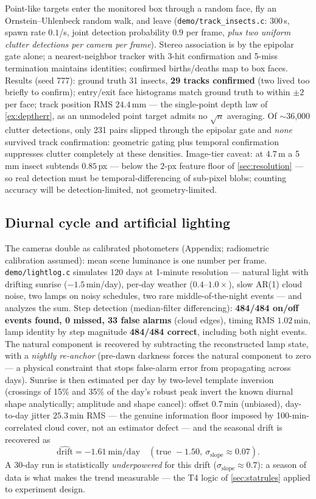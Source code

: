 \documentclass[11pt]{article}
\theoremstyle{definition}
\newcommand{\code}[1]{\texttt{#1}}
\begin{document}
Point-like targets enter the monitored box through a random face, fly an
Ornstein--Uhlenbeck random walk, and leave
(\code{demo/track\_insects.c}: 300\,s, spawn rate $0.1$/s, joint
detection probability $0.9$ per frame, \emph{plus two uniform clutter
detections per camera per frame}). Stereo association is by the epipolar
gate alone; a nearest-neighbor tracker with 3-hit confirmation and 5-miss
termination maintains identities; confirmed births/deaths map to box
faces. Results (seed 777): ground truth 31 insects, \textbf{29 tracks
confirmed} (two lived too briefly to confirm); entry/exit face
histograms match ground truth to within $\pm2$ per face; track position
RMS $24.4$\,mm --- the single-point depth law of \autoref{ex:deptherr},
as an unmodeled point target admits no $\sqrt n$ averaging. Of
$\sim$36{,}000 clutter detections, only 231 pairs slipped through the
epipolar gate and \emph{none} survived track confirmation: geometric
gating plus temporal confirmation suppresses clutter completely at these
densities. Image-tier caveat: at $4.7$\,m a 5\,mm insect subtends
$0.85$\,px --- below the $2$-px feature floor of
\autoref{sec:resolution} --- so real detection must be
temporal-differencing of sub-pixel blobs; counting accuracy will be
detection-limited, not geometry-limited.

\subsection{Diurnal cycle and artificial lighting}
\label{sec:lightscen}

The cameras double as calibrated photometers (Appendix; radiometric
calibration assumed): mean scene luminance is one number per frame.
\code{demo/lightlog.c} simulates 120 days at 1-minute resolution ---
natural light with drifting sunrise ($-1.5$\,min/day), per-day weather
($0.4$--$1.0\times$), slow AR(1) cloud noise, two lamps on noisy
schedules, two rare middle-of-the-night events --- and analyzes the sum.
Step detection (median-filter differencing): \textbf{484/484 on/off
events found, 0 missed, 33 false alarms} (cloud edges), timing RMS
$1.02$\,min, lamp identity by step magnitude \textbf{484/484 correct},
including both night events. The natural component is recovered by
subtracting the reconstructed lamp state, with a \emph{nightly
re-anchor} (pre-dawn darkness forces the natural component to zero ---
a physical constraint that stops false-alarm error from propagating
across days). Sunrise is then estimated per day by two-level template
inversion (crossings of 15\% and 35\% of the day's robust peak invert
the known diurnal shape analytically; amplitude and shape cancel):
offset $0.7$\,min (unbiased), day-to-day jitter $25.3$\,min RMS ---
the genuine information floor imposed by 100-min-correlated cloud
cover, not an estimator defect --- and the seasonal drift is recovered
as \[ \widehat{\text{drift}} = -1.61\ \text{min/day} \quad
(\text{true } -1.50,\ \sigma_{\text{slope}} \approx 0.07). \]
A 30-day run is statistically \emph{underpowered} for this drift
($\sigma_{\text{slope}}\approx0.7$): a season of data is what makes the
trend measurable --- the T4 logic of \autoref{sec:statrules} applied to
experiment design.
\end{document}
